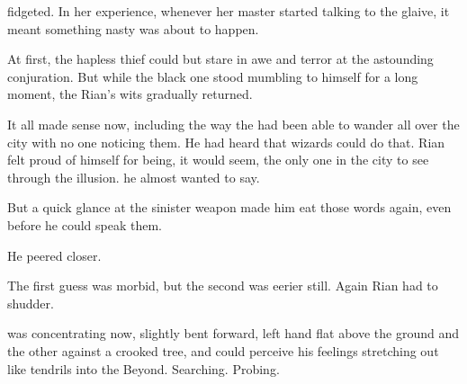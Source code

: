 \Criseis{} fidgeted. 
In her experience, whenever her master started talking to the glaive, it meant something nasty was about to happen. 







\begin{comment}
\subsubsection{Rian}
\end{comment}
\new
At first, the hapless thief could but stare in awe and terror at the astounding conjuration. But while the black one stood mumbling to himself for a long moment, the Rian's wits gradually returned. 


It all made sense now, including the way the \scathae{} had been able to wander all over the city with no one noticing them. He had heard that wizards could do that. 
Rian felt proud of himself for being, it would seem, the only one in the city to see through the illusion. 
 he almost wanted to say. 

But a quick glance at the sinister weapon made him eat those words again, even before he could speak them. 

He peered closer. 

The first guess was morbid, but the second was eerier still. Again Rian had to shudder. 







\begin{comment}
\subsubsection{\Criseis}
\end{comment}
\new
\Ishnaruchaefir{} was concentrating now, slightly bent forward, left hand flat above the ground and the other against a crooked tree, and \Criseis{} could perceive his feelings stretching out like tendrils into the Beyond. Searching. Probing. 

